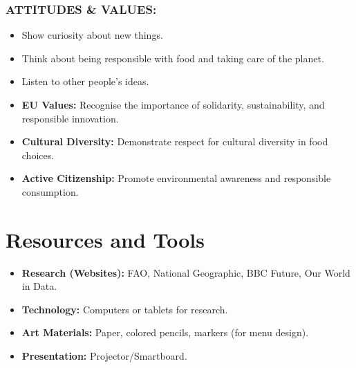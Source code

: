 \documentclass[11pt, a4paper]{article}
\begin{document}
\subsubsection*{ATTITUDES \& VALUES:}
\begin{itemize}
    \item Show curiosity about new things.
    \item Think about being responsible with food and taking care of the planet.
    \item Listen to other people's ideas.
\end{itemize}

\begin{eurobox}
\begin{itemize}
    \item \textbf{EU Values:} Recognise the importance of solidarity, sustainability, and responsible innovation.
    \item \textbf{Cultural Diversity:} Demonstrate respect for cultural diversity in food choices.
    \item \textbf{Active Citizenship:} Promote environmental awareness and responsible consumption.
\end{itemize}
\end{eurobox}

\newpage
\section{Resources and Tools}
\begin{itemize}
    \item \textbf{Research (Websites):} FAO, National Geographic, BBC Future, Our World in Data.
    \item \textbf{Technology:} Computers or tablets for research.
    \item \textbf{Art Materials:} Paper, colored pencils, markers (for menu design).
    \item \textbf{Presentation:} Projector/Smartboard.
\end{itemize}
\end{document}

